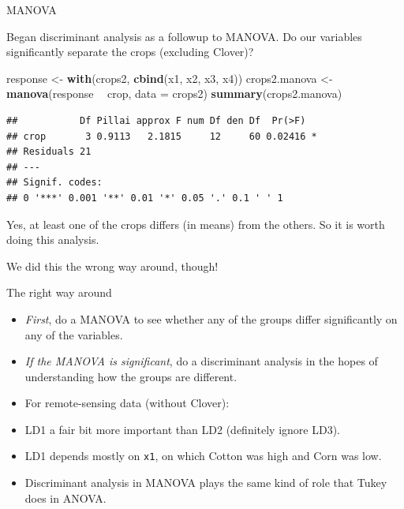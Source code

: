 \documentclass[
  ignorenonframetext,
]{beamer}
\newenvironment{Shaded}{\begin{snugshade}}{\end{snugshade}}
\newcommand{\DataTypeTok}[1]{\textcolor[rgb]{0.13,0.29,0.53}{#1}}
\newcommand{\KeywordTok}[1]{\textcolor[rgb]{0.13,0.29,0.53}{\textbf{#1}}}
\newcommand{\NormalTok}[1]{#1}
\newcommand{\OperatorTok}[1]{\textcolor[rgb]{0.81,0.36,0.00}{\textbf{#1}}}
\newcommand{\StringTok}[1]{\textcolor[rgb]{0.31,0.60,0.02}{#1}}
\begin{document}
\begin{frame}[fragile]{MANOVA}
\protect\hypertarget{manova}{}

Began discriminant analysis as a followup to MANOVA. Do our variables
significantly separate the crops (excluding Clover)?

\begin{Shaded}
\begin{Highlighting}[]
\NormalTok{response <-}\StringTok{ }\KeywordTok{with}\NormalTok{(crops2, }\KeywordTok{cbind}\NormalTok{(x1, x2, x3, x4))}
\NormalTok{crops2.manova <-}\StringTok{ }\KeywordTok{manova}\NormalTok{(response }\OperatorTok{~}\StringTok{ }\NormalTok{crop, }\DataTypeTok{data =}\NormalTok{ crops2)}
\KeywordTok{summary}\NormalTok{(crops2.manova)}
\end{Highlighting}
\end{Shaded}

\begin{verbatim}
##           Df Pillai approx F num Df den Df  Pr(>F)  
## crop       3 0.9113   2.1815     12     60 0.02416 *
## Residuals 21                                        
## ---
## Signif. codes:  
## 0 '***' 0.001 '**' 0.01 '*' 0.05 '.' 0.1 ' ' 1
\end{verbatim}

Yes, at least one of the crops differs (in means) from the others. So it
is worth doing this analysis.

We did this the wrong way around, though!

\end{frame}

\begin{frame}[fragile]{The right way around}
\protect\hypertarget{the-right-way-around}{}

\begin{itemize}
\item
  \emph{First}, do a MANOVA to see whether any of the groups differ
  significantly on any of the variables.
\item
  \emph{If the MANOVA is significant}, do a discriminant analysis in the
  hopes of understanding how the groups are different.
\item
  For remote-sensing data (without Clover):
\item
  LD1 a fair bit more important than LD2 (definitely ignore LD3).
\item
  LD1 depends mostly on \texttt{x1}, on which Cotton was high and Corn
  was low.
\item
  Discriminant analysis in MANOVA plays the same kind of role that Tukey
  does in ANOVA.
\end{itemize}

\end{frame}
\end{document}
